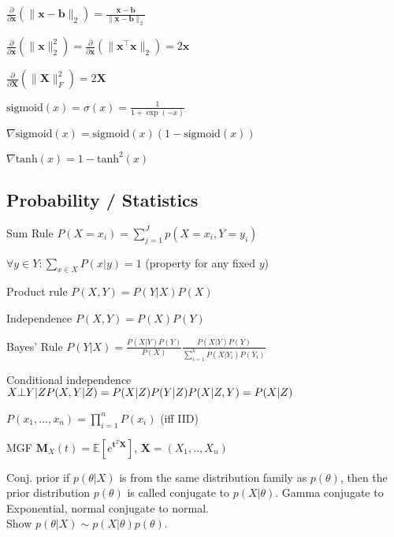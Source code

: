\begin{inparaitem}[\color{red}\textbullet]
	\item $\frac{\partial}{\partial \mathbf{x}}(\| \mathbf{x}-\mathbf{b} \|_2) = \frac{\mathbf{x}-\mathbf{b}}{\|\mathbf{x}-\mathbf{b}\|_2}$
	\item $\frac{\partial}{\partial \mathbf{x}}(\|\mathbf{x}\|^2_2) = \frac{\partial}{\partial \mathbf{x}} (\|\mathbf{x}^\top \mathbf{x}\|_2) = 2\mathbf{x}$
	\item $\frac{\partial}{\partial \mathbf{X}}(\|\mathbf{X}\|_F^2) = 2\mathbf{X}$ \\
	\item $\text{sigmoid}(x) = \sigma(x) = \frac{1}{1+\exp(-x)}$
	\item $\nabla \text{sigmoid}(x) = \text{sigmoid}(x)(1-\text{sigmoid}(x))$
	\item $\nabla \text{tanh}(x) = 1-\text{tanh}^2(x)$
\end{inparaitem}
\subsection*{Probability / Statistics}
\begin{compactdesc}
	\item[Sum Rule] $P(X=x_i) = \sum_{j=1}^{J} p(X=x_i,Y=y_i)$\\
	\item $\forall y \in Y: \sum_{x \in X} P(x|y) = 1$ (property for any fixed $y$)\\
	\item[Product rule] $ P(X, Y) = P(Y|X) P(X)$ \\
	\item[Independence] $P(X, Y) = P(X)P(Y)$ \\
	\item[Bayes' Rule]$ P(Y|X) = \frac{P(X|Y)P(Y)}{P(X)}\frac{P(X|Y)P(Y)}{\sum\limits^k_{i=1}P(X|Y_i)P(Y_i)}$\\
	\item[Conditional independence] $ X\bot Y|Z \\P(X,Y|Z) = P(X|Z)P(Y|Z) \\P(X|Z,Y) = P(X|Z)$\\		\item $P(x_1, \ldots, x_n) = \prod_{i=1}^n P(x_i)$ (iff IID)
	\item[MGF] $\mathbf{M}_X(t)=\mathbb{E}[e^{\mathbf{t}^T \mathbf{X}}]$, $\mathbf{X}=(X_1,.., X_n) $
	\item[Conj. prior] if $p(\theta|X)$ is from the same distribution family as $p(\theta)$, then the
prior distribution $p(\theta)$ is called conjugate to $p(X|\theta)$. Gamma conjugate to Exponential, normal conjugate to normal.\\ Show $p(\theta|X) \sim p(X|\theta)p(\theta)$.
\end{compactdesc}
